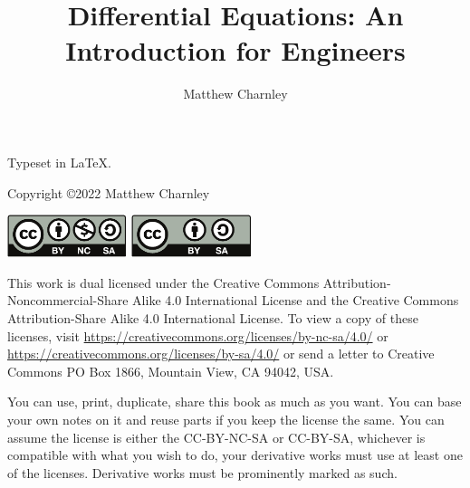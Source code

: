 \documentclass[12pt]{book}
\author{Matthew Charnley}
\title{Differential Equations: An Introduction for Engineers}
\begin{document}
\newcommand{\theversion}{0.95}
\myTitlePage

\newpage

\vspace*{\fill}

\begin{small}
\noindent
Typeset in \LaTeX.

\bigskip

\noindent
Copyright \copyright 2022 Matthew Charnley



\bigskip

\noindent
\includegraphics[width=1.38in]{figures/license}
\quad
\includegraphics[width=1.38in]{figures/license2}

\bigskip

\noindent
This work
is dual licensed under
the Creative Commons
Attribution-Non\-commercial-Share Alike 4.0 International License and
the Creative Commons
Attribution-Share Alike 4.0 International License.
To view a
copy of these licenses, visit
\url{https://creativecommons.org/licenses/by-nc-sa/4.0/}
or
\url{https://creativecommons.org/licenses/by-sa/4.0/}
or send a letter to
Creative Commons
PO Box 1866, Mountain View, CA 94042, USA\@.

\bigskip

\noindent
You can use, print, duplicate, share this book as much as you want.  You can
base your own notes on it and reuse parts if you keep the license the
same.  You can assume the license is either the
CC-BY-NC-SA or CC-BY-SA\@,
whichever is compatible with what you wish to do, your derivative works must
use at least one of the licenses.
Derivative works must be prominently marked as such.


\end{small}
\end{document}
